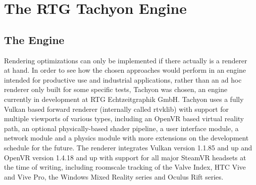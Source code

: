 
\chapter{The RTG Tachyon Engine}

\section{The Engine}
Rendering optimizations can only be implemented if there actually is a renderer at hand. In order to see how the chosen approaches would perform in an engine intended for productive use and industrial applications, rather than an ad hoc renderer only built for some specific tests, Tachyon was chosen, an engine currently in development at RTG Echtzeitgraphik GmbH. Tachyon uses a fully Vulkan based forward renderer (internally called rtvklib) with support for multiple viewports of various types, including an OpenVR based virtual reality path, an optional physically-based shader pipeline, a user interface module, a network module and a physics module with more extensions on the development schedule for the future. The renderer integrates Vulkan version 1.1.85 and up and OpenVR version 1.4.18 and up with support for all major SteamVR headsets at the time of writing, including roomscale tracking of the Valve Index, HTC Vive and Vive Pro, the Windows Mixed Reality series and Oculus Rift series. 

